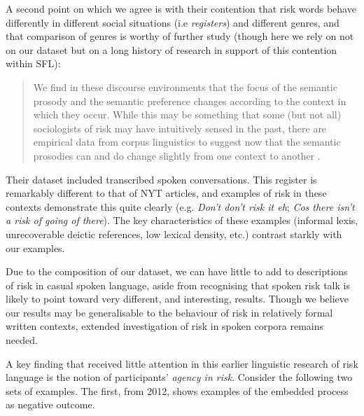 A second point on which we agree is with their contention that risk words behave differently in different social situations (i.e \emph{registers}) and different genres, and that comparison of genres is worthy of further study (though here we rely on not on our dataset but on a long history of research in support of this contention within SFL):

\begin{quote} \small \singlespacing
We find in these discourse environments that the focus of the semantic prosody and the semantic preference changes according to the context in which they occur. While this may be something that some (but not all) sociologists of risk may have intuitively sensed in the past, there are empirical data from corpus linguistics to suggest now that the semantic prosodies can and do change slightly from one context to another \citeyear[p.~177]{hamilton_meanings_2007}.
\end{quote}
%
Their dataset included transcribed spoken conversations. This register is remarkably different to that of NYT articles, and examples of risk in these contexts demonstrate this quite clearly (e.g. \emph{Don't don't risk it eh}; \emph{Cos there isn't a risk of going of there}). The key characteristics of these examples (informal lexis, unrecoverable deictic references, low lexical density, etc.) contrast starkly with our examples.

Due to the composition of our dataset, we can have little to add to descriptions of risk in casual spoken language, aside from recognising that spoken risk talk is likely to point toward very different, and interesting, results. Though we believe our results may be generalisable to the behaviour of risk in relatively formal written contexts, extended investigation of risk in spoken corpora remains needed.

A key finding that received little attention in this earlier linguistic research of risk language is the notion of participants' \emph{agency in risk}. Consider the following two sets of examples. The first, from 2012, shows examples of the embedded process as negative outcome.

